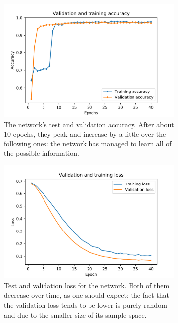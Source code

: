 \documentclass[12pt,a4paper,final]{book}			%
\begin{document}
			\begin{figure}[h!]
						\centering
				\begin{subfigure}[t]{0.65\textwidth}
					\centering
					\includegraphics[scale=0.5]{figures/accuracy.png}
					\caption{The network's test and validation accuracy. After about 10 epochs, they peak and increase by a little over the following ones: the network has managed to learn all of the possible information.}
					\label{accuracy_plot}
				\end{subfigure}
				\begin{subfigure}[t]{0.65\textwidth}
				\centering
				\includegraphics[scale=0.5]{figures/loss.png}
				\caption{Test and validation loss for the network. Both of them decrease over time, as one should expect; the fact that the validation loss tends to be lower is purely random and due to the smaller size of its sample space.}
				\label{loss_plot}
				\end{subfigure}
				\caption{}
				\label{results_plot}
			\end{figure}
			
\end{document}
